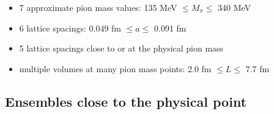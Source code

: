 \documentclass[a0,portrait]{a0poster}
\begin{document}
\begin{multicols}{2}
\begin{center}
    \end{center}
    \begin{itemize}
      \item 7 approximate pion mass values: 135 MeV $\leq M_\pi \leq $ 340 MeV
      \item 6 lattice spacings: 0.049 fm $\leq a \leq$ 0.091 fm
      \item 5 lattice spacings close to or at the physical pion mass
      \item multiple volumes at many pion mass points: 2.0 fm $\leq L \leq$ 7.7 fm
    \end{itemize}
    \subsection*{Ensembles close to the physical point}


\end{multicols}
\end{document}
